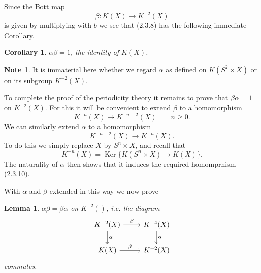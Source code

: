 \documentclass[leqno]{book}
\numberwithin{equation}{section}
\newtheorem{corollary}[theorem]{Corollary}
\newtheorem{lemma}[theorem]{Lemma}
\theoremstyle{definition}
\newtheorem*{note}{Note}
\begin{document}
            Since the Bott map
            \begin{equation*}
              \beta:K(X)\to K^{-2}(X)
            \end{equation*}
            is given by multiplying with $b$ we see that (2.3.8) has the following immediate Corollary.

            \begin{corollary}
              $\alpha \beta=1$, the identity of $K(X)$.
            \end{corollary}

            \begin{note}
              It is immaterial here whether we regard $\alpha$ as defined on $K(S^{2}\times X)$ or on its subgroup $K^{-2}(X)$.
            \end{note}

            To complete the proof of the periodicity theory it remains to prove that $\beta \alpha=1$ on $K^{-2}(X)$. For this it will be convenient to extend $\beta$ to a homomorphism 
            \begin{equation*}
              K^{-n}(X)\to K^{-n-2}(X)\qquad n\ge 0.
            \end{equation*}
            We can similarly extend $\alpha$ to a homomorphism 
            \begin{equation*}
              \tag{2.3.10}
              K^{-n-2}(X)\to K^{-n}(X).
            \end{equation*}
            \setcounter{theorem}{10}
            To do this we simply replace $X$ by $S^{n}\times X$, and recall that
            \begin{equation*}
              K^{-n}(X)=\operatorname{Ker}\{K(S^{n}\times X)\to K(X)\}.
            \end{equation*}
            The naturality of $\alpha$ then shows that it induces the required homomprhism (2.3.10).

            With $\alpha$ and $\beta$ extended in this way we now prove
            \begin{lemma}
              $\alpha \beta=\beta \alpha$ on $K^{-2}()$, i.e. the diagram
              \begin{equation*}
                \begin{tikzcd}
                  K^{-2}(X)\arrow[r, "\beta"] \arrow[d, "\alpha"] & K^{-4}(X) \arrow[d, "\alpha"] \\
                  K(X)\arrow[r, "\beta"] & K^{-2}(X)
                \end{tikzcd}
              \end{equation*}
              commutes.
            \end{lemma}
\end{document}
